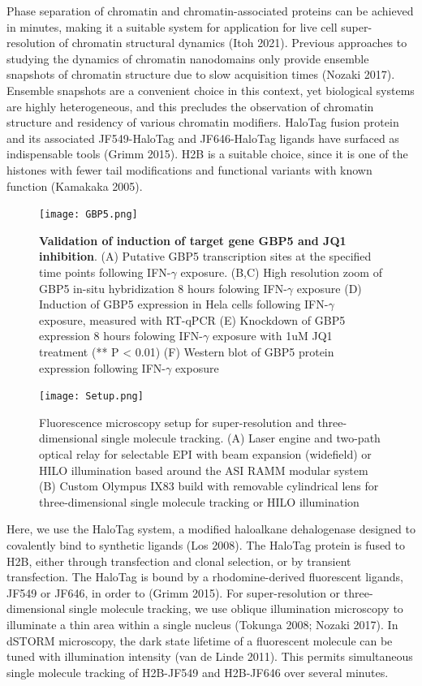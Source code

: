 \documentclass{ucetd}
\begin{document}
Phase separation of chromatin and chromatin-associated proteins can be achieved in minutes, making it a suitable system for application for live cell super-resolution of chromatin structural dynamics (Itoh 2021). Previous approaches to studying the dynamics of chromatin nanodomains only provide ensemble snapshots of chromatin structure due to slow acquisition times (Nozaki 2017). Ensemble snapshots are a convenient choice in this context, yet biological systems are highly heterogeneous, and this precludes the observation of chromatin structure and residency of various chromatin modifiers. HaloTag fusion protein and its associated JF549-HaloTag and JF646-HaloTag ligands have surfaced as indispensable tools (Grimm 2015). H2B is a suitable choice, since it is one of the histones with fewer tail modifications and functional variants with known function (Kamakaka 2005).

\clearpage
\begin{figure}
\begin{center}
\texttt{[image: GBP5.png]}
\end{center}
\caption{\textbf{Validation of induction of target gene GBP5 and JQ1 inhibition}. (A) Putative GBP5 transcription sites at the specified time points following IFN-$\gamma$ exposure. (B,C) High resolution zoom of GBP5 in-situ hybridization 8 hours folowing IFN-$\gamma$ exposure (D) Induction of GBP5 expression in Hela cells following IFN-$\gamma$ exposure, measured with RT-qPCR (E) Knockdown of GBP5 expression 8 hours folowing IFN-$\gamma$ exposure with 1uM JQ1 treatment (** P < 0.01) (F) Western blot of GBP5 protein expression following IFN-$\gamma$ exposure}
\end{figure}


\clearpage
\begin{figure}
\begin{center}
\texttt{[image: Setup.png]}
\end{center}


\caption{Fluorescence microscopy setup for super-resolution and three-dimensional single molecule tracking. (A) Laser engine and two-path optical relay for selectable EPI with beam expansion (widefield) or HILO illumination based around the ASI RAMM modular system (B) Custom Olympus IX83 build with removable cylindrical lens for three-dimensional single molecule tracking or HILO illumination}
\end{figure}

Here, we use the HaloTag system, a modified haloalkane dehalogenase designed to covalently bind to synthetic ligands  (Los 2008). The HaloTag protein is fused to H2B, either through transfection and clonal selection, or by transient transfection. The HaloTag is bound by a rhodomine-derived fluorescent ligands, JF549 or JF646, in order to (Grimm 2015). For super-resolution or three-dimensional single molecule tracking, we use oblique illumination microscopy to illuminate a thin area within a single nucleus (Tokunga 2008; Nozaki 2017). In dSTORM microscopy, the dark state lifetime of a fluorescent molecule can be tuned with illumination intensity (van de Linde 2011). This permits simultaneous single molecule tracking of H2B-JF549 and H2B-JF646 over several minutes. 
\end{document}
